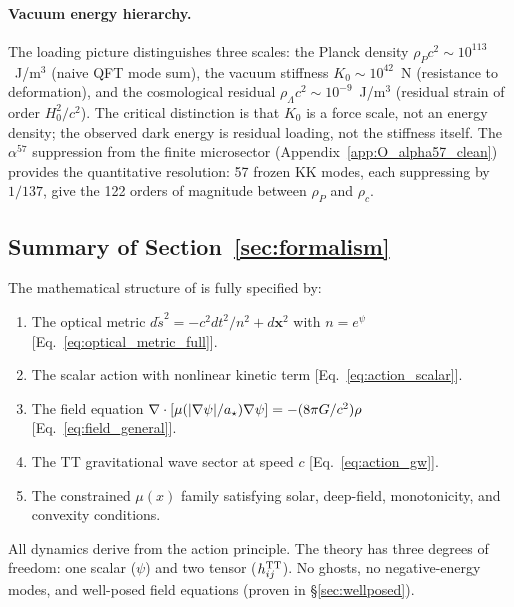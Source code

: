\paragraph{Vacuum energy hierarchy.}
The loading picture distinguishes three scales: the Planck density
$\rho_P c^2 \sim 10^{113}$~J/m$^3$ (naive QFT mode sum), the vacuum
stiffness $K_0 \sim 10^{42}$~N (resistance to deformation), and the
cosmological residual $\rho_\Lambda c^2 \sim 10^{-9}$~J/m$^3$
(residual strain of order $H_0^2/c^2$). The critical distinction is that
$K_0$ is a force scale, not an energy density; the observed dark energy is
residual loading, not the stiffness itself. The $\alpha^{57}$ suppression
from the finite microsector (Appendix~\ref{app:O_alpha57_clean}) provides
the quantitative resolution: 57 frozen KK modes, each suppressing by
$1/137$, give the 122 orders of magnitude between $\rho_P$ and $\rho_c$.

\subsection{Summary of Section~\ref{sec:formalism}}

The mathematical structure of \DFD is fully specified by:
\begin{enumerate}
\item The optical metric $d\tilde{s}^2 = -c^2dt^2/n^2 + d\mathbf{x}^2$ 
with $n = e^\psi$ [Eq.~\eqref{eq:optical_metric_full}].
\item The scalar action with nonlinear kinetic term 
[Eq.~\eqref{eq:action_scalar}].
\item The field equation 
$\nabla\cdot[\mu(|\nabla\psi|/a_\star)\nabla\psi] = -(8\pi G/c^2)\rho$ 
[Eq.~\eqref{eq:field_general}].
\item The TT gravitational wave sector at speed $c$ 
[Eq.~\eqref{eq:action_gw}].
\item The constrained $\mu(x)$ family satisfying solar, deep-field, 
monotonicity, and convexity conditions.
\end{enumerate}

All dynamics derive from the action principle. The theory has three 
degrees of freedom: one scalar ($\psi$) and two tensor ($h_{ij}^{\rm TT}$). 
No ghosts, no negative-energy modes, and well-posed field equations 
(proven in \S\ref{sec:wellposed}).

